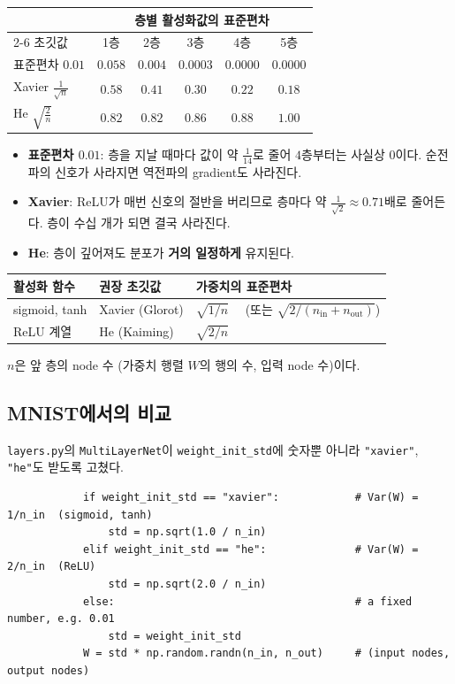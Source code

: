 \documentclass[11pt,a4paper]{article}
\begin{document}
\begin{center}
\begin{tabular}{@{}lccccc@{}}
\toprule
& \multicolumn{5}{c}{층별 활성화값의 표준편차} \\
\cmidrule(l){2-6}
초깃값 & 1층 & 2층 & 3층 & 4층 & 5층 \\
\midrule
표준편차 $0.01$ & $0.058$ & $0.004$ & $0.0003$ & $0.0000$ & $0.0000$ \\
Xavier $\frac{1}{\sqrt n}$ & $0.58$ & $0.41$ & $0.30$ & $0.22$ & $0.18$ \\
He $\sqrt{\frac2n}$ & $0.82$ & $0.82$ & $0.86$ & $0.88$ & $1.00$ \\
\bottomrule
\end{tabular}
\end{center}

\begin{itemize}[leftmargin=1.8em]
\item \textbf{표준편차 $0.01$}: 층을 지날 때마다 값이 약 $\frac{1}{14}$로 줄어 $4$층부터는 사실상 $0$이다.
순전파의 신호가 사라지면 역전파의 gradient도 사라진다.
\item \textbf{Xavier}: ReLU가 매번 신호의 절반을 버리므로 층마다 약 $\frac{1}{\sqrt2}\approx0.71$배로 줄어든다.
층이 수십 개가 되면 결국 사라진다.
\item \textbf{He}: 층이 깊어져도 분포가 \textbf{거의 일정하게} 유지된다.
\end{itemize}

\begin{keybox}[초깃값 정리]
\begin{center}
\begin{tabular}{@{}lll@{}}
\toprule
활성화 함수 & 권장 초깃값 & 가중치의 표준편차 \\
\midrule
sigmoid, tanh & Xavier (Glorot) & $\sqrt{1/n}$ \ \ (또는 $\sqrt{2/(n_{\mathrm{in}}+n_{\mathrm{out}})}$) \\
ReLU 계열 & He (Kaiming) & $\sqrt{2/n}$ \\
\bottomrule
\end{tabular}
\end{center}
$n$은 앞 층의 node 수 (가중치 행렬 $W$의 행의 수, 입력 node 수)이다.
\end{keybox}

\subsection{MNIST에서의 비교}\label{sec:mnistinit}

\texttt{layers.py}의 \texttt{MultiLayerNet}이 \texttt{weight\_init\_std}에 숫자뿐 아니라
\texttt{"xavier"}, \texttt{"he"}도 받도록 고쳤다.
\begin{lstlisting}
            if weight_init_std == "xavier":            # Var(W) = 1/n_in  (sigmoid, tanh)
                std = np.sqrt(1.0 / n_in)
            elif weight_init_std == "he":              # Var(W) = 2/n_in  (ReLU)
                std = np.sqrt(2.0 / n_in)
            else:                                      # a fixed number, e.g. 0.01
                std = weight_init_std
            W = std * np.random.randn(n_in, n_out)     # (input nodes, output nodes)
\end{lstlisting}
\end{document}
